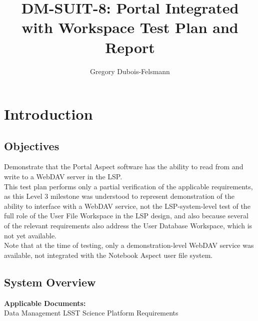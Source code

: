 \documentclass[DM,lsstdraft,STR,toc]{lsstdoc}
\begin{document}
\def\milestoneName{Portal Integrated with Workspace}
\def\milestoneId{DM-SUIT-8}
\def\product{LSP Services}


\title{DM-SUIT-8: Portal Integrated with Workspace Test Plan and Report}
\setDocRef{\lsstDocType-\lsstDocNum}
\date{\vcsdate}
\author{ Gregory Dubois-Felsmann }






\maketitle

\section{Introduction}
\label{sect:intro}


\subsection{Objectives}
\label{sect:objectives}

 Demonstrate that the Portal Aspect software has the ability to read from
and write to a WebDAV server in the LSP.\\
This test plan performs only a partial verification of the applicable
requirements, as this Level 3 milestone was understood to represent
demonstration of the ability to interface with a WebDAV service, not the
LSP-system-level test of the full role of the User File Workspace in the
LSP design, and also because several of the relevant requirements also
address the User Database Workspace, which is not yet
available.\\[2\baselineskip]Note that at the time of testing, only a
demonstration-level WebDAV service was available, not integrated with
the Notebook Aspect user file system.



\subsection{System Overview}
\label{sect:systemoverview}

 \textbf{Applicable Documents:}\\[2\baselineskip] Data Management
LSST Science Platform Requirements
\end{document}
